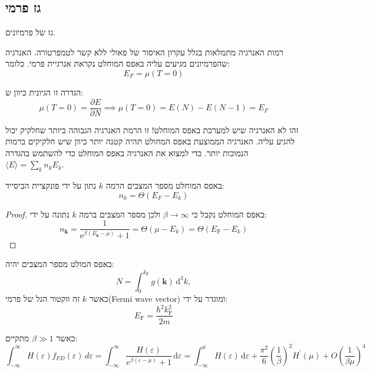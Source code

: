 \documentclass{tstextbook}
\begin{document}
\subsection{גז פרמי}

\begin{definition}[גז פרמי]
גז של פרמיונים.

\end{definition}
\begin{definition}
רמות האנרגיה מתמלאות בגלל עקרון האיסור של פאולי ללא קשר לטמפרטורה. האנרגיה שהפרמיונים מגיעים עליה באפס המוחלט נקראת אנרגיית פרמי. כלומר:
$$E_{F}=\mu(T=0)$$

\end{definition}
\begin{remark}
הגדרה זו הגיונית כיוון ש:
$$\mu(T=0)=\frac{\partial E}{\partial N} \implies \mu(T=0)=E(N)-E(N-1)=E_{F}$$

\end{remark}
\begin{remark}
זהו לא האנרגיה שיש למערכת באפס המוחלט! זו הרמת האנרגיה הגבוהה ביותר שחלקיק יכול להגיע עליה. האנרגיה הממוצעת באפס המחולט תהיה קטנה יותר כיוון שיש חלקיקים ברמות הנמוכות יותר. כדי למצוא את האנרגיה באפס המוחלט כדי להשתמש בהגדרה \(\langle E \rangle=\sum_{k}n_{k}E_{k}\).

\end{remark}
\begin{proposition}
באפס המוחלט מספר המצבים הרמה \(k\) נתון על ידי פונקציית הביסייד:
$$n_{k}=\Theta(E_{F}-E_{k})$$

\end{proposition}
\begin{proof}
באפס המוחלט נקבל כי \(\beta\to \infty\) ולכן מספר המצבים ברמה \(k\) נתונה על ידי:
$$n_{\mathbf{k}}={\frac{1}{\mathrm{e}^{\beta(E_{\mathbf{k}}-\mu)}+1}}=\Theta(\mu-E_{k})=\Theta(E_{\mathrm{F}}-E_{k})$$

\end{proof}
\begin{corollary}
באפס המולט מספר המצבים יהיה:
$$N=\int_{0}^{k_{\mathrm{F}}}g({\boldsymbol{k}})\,\mathrm{d}^{3}k,$$
כאשר \(k\) זה ווקטור הגל של פרמי(Fermi wave vector) ומוגדר על ידי:
$$E_{\mathrm{F}}={\frac{\hbar^{2}k_{\mathrm{F}}^{2}}{2m}}$$

\end{corollary}
\begin{proposition}
כאשר \(\beta\gg 1\) מתקיים:
$$\int_{-\infty}^{\infty} H\left( \varepsilon \right)f_{FD}\left( \varepsilon \right) \, d\varepsilon = \int_{-\infty}^{\infty}{\frac{H\left( \varepsilon \right)}{e^{\beta\left( \varepsilon-\mu \right)}+1}}\,\mathrm{d}\varepsilon=\int_{-\infty}^{\mu}H\left( \varepsilon \right)\,\mathrm{d}\varepsilon+{\frac{\pi^{2}}{6}}\left({\frac{1}{\beta}}\right)^{2}H^{\prime}\left( \mu \right)+O\left({\frac{1}{\beta\mu}}\right)^{4}$$

\end{proposition}
\end{document}
